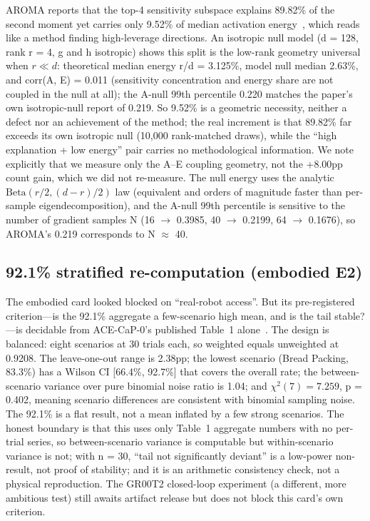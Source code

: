 AROMA reports that the top-4 sensitivity subspace explains 89.82\% of the
second moment yet carries only 9.52\% of median activation
energy~\cite{aroma2026}, which reads like a method finding high-leverage
directions. An isotropic null model (d = 128, rank r = 4, g and h isotropic)
shows this split is the low-rank geometry universal when $r \ll d$: theoretical
median energy r/d = 3.125\%, model null median 2.63\%, and corr(A, E) = 0.011
(sensitivity concentration and energy share are not coupled in the null at all);
the A-null 99th percentile 0.220 matches the paper's own isotropic-null report of
0.219. So 9.52\% is a geometric necessity, neither a defect nor an achievement of
the method; the real increment is that 89.82\% far exceeds its own isotropic
null (10{,}000 rank-matched draws), while the ``high explanation + low energy''
pair carries no methodological information. We note explicitly that we measure
only the A--E coupling geometry, not the +8.00pp count gain, which we did not
re-measure. The null energy uses the analytic $\mathrm{Beta}(r/2,(d-r)/2)$ law
(equivalent and orders of magnitude faster than per-sample eigendecomposition),
and the A-null 99th percentile is sensitive to the number of gradient samples N
(16 $\rightarrow$ 0.3985, 40 $\rightarrow$ 0.2199, 64 $\rightarrow$ 0.1676), so
AROMA's 0.219 corresponds to N $\approx$ 40.

\subsection{92.1\% stratified re-computation (embodied E2)}

The embodied card looked blocked on ``real-robot access''. But its pre-registered
criterion---is the 92.1\% aggregate a few-scenario high mean, and is the tail
stable?---is decidable from ACE-CaP-0's published Table~1 alone~\cite{acecap0}.
The design is balanced: eight scenarios at 30 trials each, so weighted equals
unweighted at 0.9208. The leave-one-out range is 2.38pp; the lowest scenario
(Bread Packing, 83.3\%) has a Wilson CI [66.4\%, 92.7\%] that covers the overall
rate; the between-scenario variance over pure binomial noise ratio is 1.04; and
$\chi^2(7) = 7.259$, p = 0.402, meaning scenario differences are consistent with
binomial sampling noise. The 92.1\% is a flat result, not a mean inflated by a few
strong scenarios. The honest boundary is that this uses only Table~1 aggregate
numbers with no per-trial series, so between-scenario variance is computable but
within-scenario variance is not; with n = 30, ``tail not significantly deviant''
is a low-power non-result, not proof of stability; and it is an arithmetic
consistency check, not a physical reproduction. The GR00T2 closed-loop
experiment (a different, more ambitious test) still awaits artifact release but
does not block this card's own criterion.